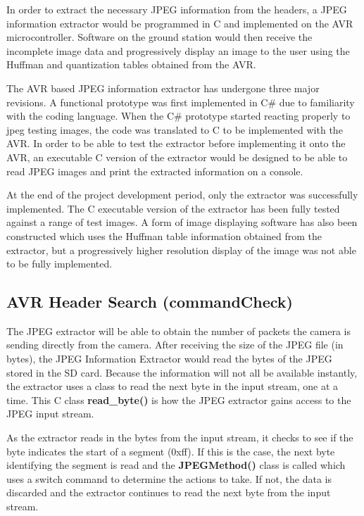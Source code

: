 In order to extract the necessary JPEG information from
the headers, a JPEG information extractor would be
programmed in C and implemented on the AVR microcontroller.
Software on the ground station would then 
receive the incomplete image data and
progressively display an image to the user using the Huffman
and quantization tables obtained from the AVR.

The AVR based JPEG information extractor has undergone
three major revisions. A functional prototype was first
implemented in C\# due to familiarity with the coding language.
When the C\# prototype started reacting properly to 
jpeg testing images, the code was translated to C to be
implemented with the AVR. In order to be able to test
the extractor before implementing it onto the AVR, an 
executable C version of the extractor would be designed
to be able to read JPEG images and print the extracted
information on a console.

At the end of the project development period, only the 
extractor was successfully implemented. The C executable 
version of the extractor has been fully tested against 
a range of test images. A form of image displaying 
software has also been constructed which uses the 
Huffman table information obtained from the extractor, 
but a progressively higher resolution display of 
the image was not able to be fully implemented.

\subsection{AVR Header Search (commandCheck)}

The JPEG extractor will be able to obtain the 
number of packets the camera is sending directly from the camera.
After receiving the size of the JPEG file (in bytes), 
the JPEG Information Extractor would read the bytes of the JPEG stored in the SD card. 
Because the information will not all be available instantly, 
the extractor uses a class to read the next byte in the input stream, one at a time. 
This C class \textbf{read\_byte()} is how the JPEG extractor 
gains access to the JPEG input stream. 

As the extractor reads in the bytes from the input stream, it checks to see if the byte indicates the start of a segment (0xff). 
If this is the case, the next byte identifying the segment is read and the \textbf{JPEGMethod()} class is 
called which uses a switch command to determine the actions to take. 
If not, the data is discarded and the extractor continues 
to read the next byte from the input stream. 

